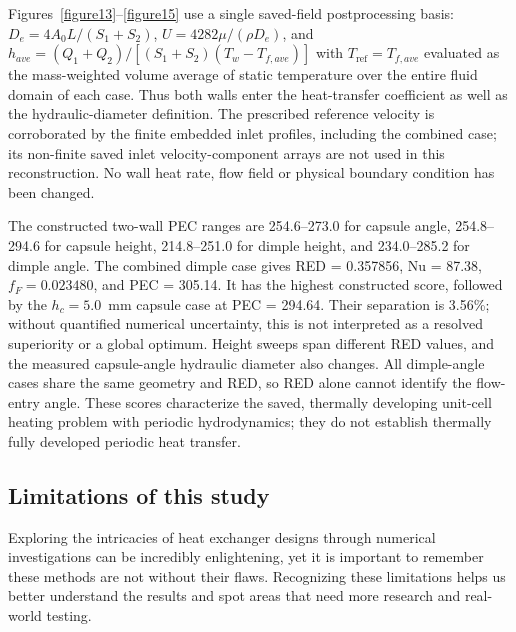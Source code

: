 \documentclass[energies,article,submit,moreauthors,noheaderline]{Definitions/mdpi}
\def\,{ }%
\begin{document}
Figures~\ref{figure13}--\ref{figure15} use a single saved-field postprocessing basis: $D_e=4A_0L/(S_1+S_2)$, $U=4282\mu/(\rho D_e)$, and $h_{ave}=(Q_1+Q_2)/[(S_1+S_2)(T_w-T_{f,ave})]$ with $T_{\mathrm{ref}}=T_{f,ave}$ evaluated as the mass-weighted volume average of static temperature over the entire fluid domain of each case. Thus both walls enter the heat-transfer coefficient as well as the hydraulic-diameter definition. The prescribed reference velocity is corroborated by the finite embedded inlet profiles, including the combined case; its non-finite saved inlet velocity-component arrays are not used in this reconstruction. No wall heat rate, flow field or physical boundary condition has been changed.

The constructed two-wall PEC ranges are 254.6--273.0 for capsule angle, 254.8--294.6 for capsule height, 214.8--251.0 for dimple height, and 234.0--285.2 for dimple angle. The combined dimple case gives RED\,=\,0.357856, Nu\,=\,87.38, $f_F=0.023480$, and PEC\,=\,305.14. It has the highest constructed score, followed by the $h_c=5.0$~mm capsule case at PEC\,=\,294.64. Their separation is 3.56\%; without quantified numerical uncertainty, this is not interpreted as a resolved superiority or a global optimum. Height sweeps span different RED values, and the measured capsule-angle hydraulic diameter also changes. All dimple-angle cases share the same geometry and RED, so RED alone cannot identify the flow-entry angle. These scores characterize the saved, thermally developing unit-cell heating problem with periodic hydrodynamics; they do not establish thermally fully developed periodic heat transfer.

\subsection{Limitations of this study}
\label{sec:limitations}

Exploring the intricacies of heat exchanger designs through numerical investigations can be incredibly enlightening, yet it is important to remember these methods are not without their flaws. Recognizing these limitations helps us better understand the results and spot areas that need more research and real-world testing.
\end{document}
